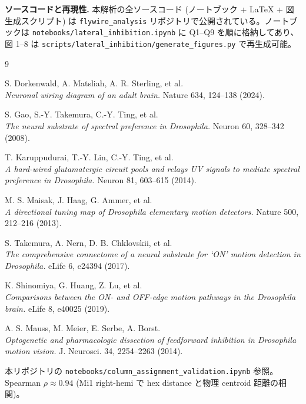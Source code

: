 \documentclass[11pt,a4paper]{ltjsarticle}
\begin{document}
\bigskip
\noindent\textbf{ソースコードと再現性.} 本解析の全ソースコード (ノートブック + LaTeX + 図生成スクリプト) は \texttt{flywire\_analysis} リポジトリで公開されている。ノートブックは \texttt{notebooks/lateral\_inhibition.ipynb} に Q1--Q9 を順に格納してあり、図 1--8 は \texttt{scripts/lateral\_inhibition/generate\_figures.py} で再生成可能。

\begin{thebibliography}{9}

S. Dorkenwald, A. Matsliah, A. R. Sterling, et al.\\
\textit{Neuronal wiring diagram of an adult brain.}
Nature 634, 124--138 (2024).

S. Gao, S.-Y. Takemura, C.-Y. Ting, et al.\\
\textit{The neural substrate of spectral preference in Drosophila.}
Neuron 60, 328--342 (2008).

T. Karuppudurai, T.-Y. Lin, C.-Y. Ting, et al.\\
\textit{A hard-wired glutamatergic circuit pools and relays UV signals to mediate spectral preference in Drosophila.}
Neuron 81, 603--615 (2014).

M. S. Maisak, J. Haag, G. Ammer, et al.\\
\textit{A directional tuning map of Drosophila elementary motion detectors.}
Nature 500, 212--216 (2013).

S. Takemura, A. Nern, D. B. Chklovskii, et al.\\
\textit{The comprehensive connectome of a neural substrate for `ON' motion detection in Drosophila.}
eLife 6, e24394 (2017).

K. Shinomiya, G. Huang, Z. Lu, et al.\\
\textit{Comparisons between the ON- and OFF-edge motion pathways in the Drosophila brain.}
eLife 8, e40025 (2019).

A. S. Mauss, M. Meier, E. Serbe, A. Borst.\\
\textit{Optogenetic and pharmacologic dissection of feedforward inhibition in Drosophila motion vision.}
J. Neurosci. 34, 2254--2263 (2014).

本リポジトリの \texttt{notebooks/column\_assignment\_validation.ipynb} 参照。
Spearman $\rho \approx 0.94$ (Mi1 right-hemi で hex distance と物理 centroid 距離の相関)。

\end{thebibliography}
\end{document}
